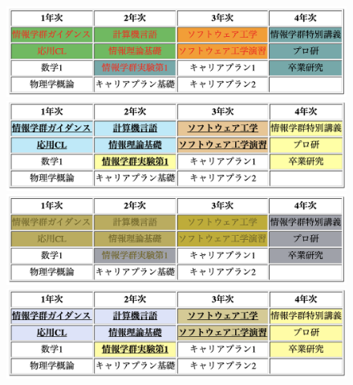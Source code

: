 \section{\result}
\begin{figure}[H]
    \centering
    \begin{minipage}[b]{.49\columnwidth}
        \centering
        \includegraphics[keepaspectratio,width=\textwidth]{../../10_UniversalDesign/no1_table_original.png}
    \end{minipage}
    \begin{minipage}[b]{.49\columnwidth}
        \centering
        \includegraphics[keepaspectratio,width=\textwidth]{../../10_UniversalDesign/no1_tableR_original.png}
    \end{minipage}
    \begin{minipage}[b]{.49\columnwidth}
        \centering
        \includegraphics[keepaspectratio,width=\textwidth]{../../10_UniversalDesign/no1_table_OC_P.png}
    \end{minipage}
    \begin{minipage}[b]{.49\columnwidth}
        \centering
        \includegraphics[keepaspectratio,width=\textwidth]{../../10_UniversalDesign/no1_table_RC_P.png}

\end{minipage}
\end{figure}
